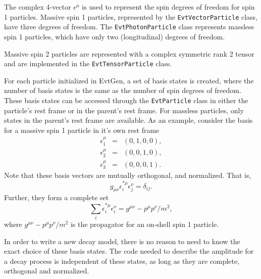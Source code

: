 The complex 4-vector
$\epsilon^{\mu}$ is used to represent 
the spin degrees of freedom for
spin 1 particles.  Massive spin 1 particles, represented
by the {\tt EvtVectorParticle} class,
have three degrees of freedom.  The
{\tt EvtPhotonParticle} class represents massless
spin 1 particles, which have only two (longitudinal) 
degrees of freedom.

Massive spin 2 particles are represented 
with a complex symmetric rank 2 tensor and are
implemented in the {\tt EvtTensorParticle}
class. 

For each particle initialized in EvtGen, a set of
basis states is created, where the number of basis states is
the same as the number of spin degrees of freedom.
These basis states can be accessed 
through the {\tt EvtParticle} class 
in either the particle's rest frame or in
the parent's rest frame. For massless particles, only states
in the parent's rest frame are available.
As an example, consider the basis
for a massive spin 1 particle in it's own rest frame
\begin{eqnarray}
\epsilon^{\mu}_1&=&(0,1,0,0),\\
\epsilon^{\mu}_2&=&(0,0,1,0),\\
\epsilon^{\mu}_3&=&(0,0,0,1).
\end{eqnarray}
Note that these basis vectors are mutually orthogonal, and
normalized. That is,
\begin{equation}
g_{\mu\nu}\epsilon^{*\mu}_i\epsilon^{\nu}_j=\delta_{ij}.
\end{equation}
Further, they form a complete set 
\begin{equation}
\sum_i\epsilon^{*\mu}_i\epsilon^{\nu}_i=g^{\mu\nu}-p^{\mu}p^{\nu}/m^2,
\end{equation}
where $g^{\mu\nu}-p^{\mu}p^{\nu}/m^2$
is the propagator for an on-shell spin 1 particle.

In order to write a new decay model, there
is no reason to need to know the exact choice of
these basis states.  The code needed to describe the amplitude
for a decay process is independent of these states, as
long as they are complete, orthogonal and normalized.



